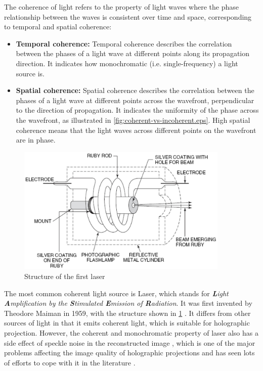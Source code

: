 The coherence of light refers to the property of light waves where the phase relationship between the waves is consistent over time and space, corresponding to temporal and spatial coherence:
\begin{itemize}
  \item \textbf{Temporal coherence:} Temporal coherence describes the correlation between the phases of a light wave at different points along its propagation direction. It indicates how monochromatic (i.e. single-frequency) a light source is.
  \item \textbf{Spatial coherence:} Spatial coherence describes the correlation between the phases of a light wave at different points across the wavefront, perpendicular to the direction of propagation. It indicates the uniformity of the phase across the wavefront, as illustrated in \cref{fig:coherent-vs-incoherent.eps}. High spatial coherence means that the light waves across different points on the wavefront are in phase.
\end{itemize}

\begin{figure}[H]
	\centering
	\includegraphics[width=0.9\textwidth]{first_laser.jpg}
	\caption{Structure of the first laser \cite{Hecht2008}}
	\label{fig:first_laser}
\end{figure}

The most common coherent light source is Laser, which stands for \textit{\textbf{L}ight \textbf{A}mplification by the \textbf{S}timulated \textbf{E}mission of \textbf{R}adiation}. It was first invented by Theodore Maiman in 1959, with the structure shown in \cref{fig:first_laser} \cite{Hecht2008, Gordon1959, Cartlidge2007}. It differs from other sources of light in that it emits coherent light, which is suitable for holographic projection. However, the coherent and monochromatic property of laser also has a side effect of speckle noise in the reconstructed image \cite{John1966}, which is one of the major problems affecting the image quality of holographic projections and has seen lots of efforts to cope with it in the literature \cite{Cable2004,Stangner2017, Deng2021,Hands2022}.


